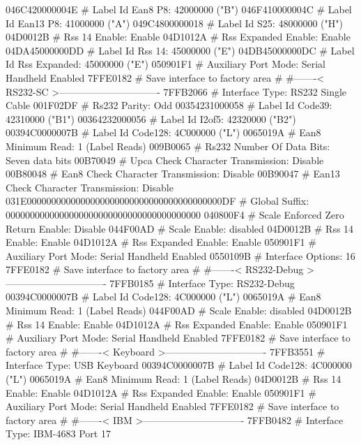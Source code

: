 046C420000004E      # Label Id Ean8 P8: 42000000 ("B")
046F410000004C      # Label Id Ean13 P8: 41000000 ("A")
049C4800000018      # Label Id S25: 48000000 ("H")
04D0012B            # Rss 14 Enable: Enable
04D1012A            # Rss Expanded Enable: Enable
04DA45000000DD      # Label Id Rss 14: 45000000 ("E")
04DB45000000DC      # Label Id Rss Expanded: 45000000 ("E")
050901F1            # Auxiliary Port Mode: Serial Handheld Enabled
7FFE0182            # Save interface to factory area
#
#-------< RS232-SC >-------------------------------
7FFB2066            # Interface Type: RS232 Single Cable
001F02DF            # Rs232 Parity: Odd
00354231000058      # Label Id Code39: 42310000 ("B1")
00364232000056      # Label Id I2of5: 42320000 ("B2")
00394C0000007B      # Label Id Code128: 4C000000 ("L")
0065019A            # Ean8 Minimum Read: 1 (Label Reads)
009B0065            # Rs232 Number Of Data Bits: Seven data bits
00B70049            # Upca Check Character Transmission: Disable
00B80048            # Ean8 Check Character Transmission: Disable
00B90047            # Ean13 Check Character Transmission: Disable
031E0000000000000000000000000000000000000000DF  # Global Suffix: 0000000000000000000000000000000000000000
040800F4            # Scale Enforced Zero Return Enable: Disable
044F00AD            # Scale Enable: disabled
04D0012B            # Rss 14 Enable: Enable
04D1012A            # Rss Expanded Enable: Enable
050901F1            # Auxiliary Port Mode: Serial Handheld Enabled
0550109B            # Interface Options: 16
7FFE0182            # Save interface to factory area
#
#-------< RS232-Debug >-------------------------------
7FFB0185            # Interface Type: RS232-Debug
00394C0000007B      # Label Id Code128: 4C000000 ("L")
0065019A            # Ean8 Minimum Read: 1 (Label Reads)
044F00AD            # Scale Enable: disabled
04D0012B            # Rss 14 Enable: Enable
04D1012A            # Rss Expanded Enable: Enable
050901F1            # Auxiliary Port Mode: Serial Handheld Enabled
7FFE0182            # Save interface to factory area
#
#-------< Keyboard >-------------------------------
7FFB3551            # Interface Type: USB Keyboard
00394C0000007B      # Label Id Code128: 4C000000 ("L")
0065019A            # Ean8 Minimum Read: 1 (Label Reads)
04D0012B            # Rss 14 Enable: Enable
04D1012A            # Rss Expanded Enable: Enable
050901F1            # Auxiliary Port Mode: Serial Handheld Enabled
7FFE0182            # Save interface to factory area
#
#-------< IBM >-------------------------------
7FFB0482            # Interface Type: IBM-4683 Port 17
